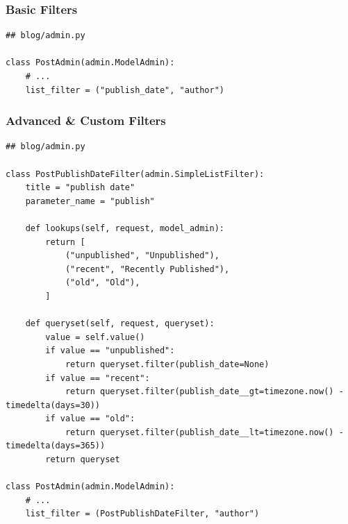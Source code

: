 \documentclass[aspectratio=169]{beamer}
\begin{document}
\begin{frame}[fragile]
\frametitle{Basic Filters}

{\tiny
\begin{verbatim}
## blog/admin.py

class PostAdmin(admin.ModelAdmin):
    # ...
    list_filter = ("publish_date", "author")
\end{verbatim}
}

\end{frame}

\begin{frame}
  \begin{figure}[p]
    \centering
  \end{figure}
\end{frame}


\begin{frame}[fragile]
\frametitle{Advanced \& Custom Filters}

{\tiny
\begin{verbatim}
## blog/admin.py

class PostPublishDateFilter(admin.SimpleListFilter):
    title = "publish date"
    parameter_name = "publish"

    def lookups(self, request, model_admin):
        return [
            ("unpublished", "Unpublished"),
            ("recent", "Recently Published"),
            ("old", "Old"),
        ]

    def queryset(self, request, queryset):
        value = self.value()
        if value == "unpublished":
            return queryset.filter(publish_date=None)
        if value == "recent":
            return queryset.filter(publish_date__gt=timezone.now() - timedelta(days=30))
        if value == "old":
            return queryset.filter(publish_date__lt=timezone.now() - timedelta(days=365))
        return queryset

class PostAdmin(admin.ModelAdmin):
    # ...
    list_filter = (PostPublishDateFilter, "author")
\end{verbatim}
}
\end{frame}
\end{document}
